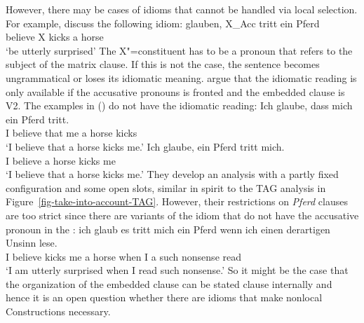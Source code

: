 \documentclass[output=paper]{langsci/langscibook}
\begin{document}
However, there may be cases of idioms that cannot be handled via local selection.
For example,  discuss the following idiom:
\ea
\label{mich-tritt-ein-Pferd}
\gll glauben, X\_Acc tritt ein Pferd\\
     believe  X     kicks a horse\\
\glt `be utterly surprised'
\z
The X"=constituent has to be a pronoun that refers to the subject of the matrix clause. If this is not the case, the sentence becomes ungrammatical or loses its idiomatic meaning.
\eal
{}
\zl
\citet[]{RS2009a} argue that the idiomatic reading
is only available if the accusative pronouns is fronted and the embedded clause is V2. The examples
in () do not have the idiomatic reading:
\eal
\ex 
\gll Ich glaube, dass mich ein Pferd tritt.\\
     I believe   that me   a horse   kicks\\
\glt `I believe that a horse kicks me.'
\ex 
\gll Ich glaube, ein Pferd tritt mich.\\
     I believe   a horse   kicks me\\
\glt `I believe that a horse kicks me.'
\zl
They develop an analysis with a partly fixed configuration and some open slots, similar in spirit to
the TAG analysis in Figure~\ref{fig-take-into-account-TAG}. However, their restrictions on \emph{Pferd} clauses are too strict since there are
variants of the idiom that do not have the accusative pronoun in the \vf:
\ea 
\gll ich glaub es tritt mich ein Pferd wenn ich einen derartigen Unsinn lese.\footnotemark\\
     I believe \expl{} kicks me a horse when I a such nonsense read\\
\glt `I am utterly surprised when I read such nonsense.'
\z
So it might be the case that the organization of the embedded clause can be stated clause internally
and hence it is an open question whether there are idioms that make nonlocal Constructions necessary.
\end{document}
